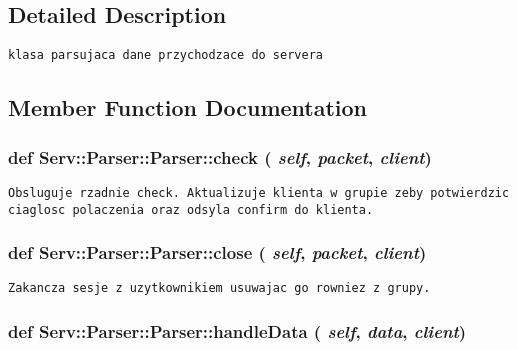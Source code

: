 \subsection{Detailed Description}


\footnotesize\begin{verbatim}klasa parsujaca dane przychodzace do servera

\end{verbatim}
\normalsize
 

\subsection{Member Function Documentation}
\hypertarget{class_serv_1_1_parser_1_1_parser_93e284233267c2db61d20d9239fed4c8}{
\subsubsection[{check}]{\setlength{\rightskip}{0pt plus 5cm}def Serv::Parser::Parser::check ( {\em self}, \/   {\em packet}, \/   {\em client})}}
\label{class_serv_1_1_parser_1_1_parser_93e284233267c2db61d20d9239fed4c8}




\footnotesize\begin{verbatim}Obsluguje rzadnie check. Aktualizuje klienta w grupie zeby potwierdzic ciaglosc polaczenia oraz odsyla confirm do klienta.

\end{verbatim}
\normalsize
 \hypertarget{class_serv_1_1_parser_1_1_parser_b6aa6195abf7a68df644640a8e4fd263}{
\subsubsection[{close}]{\setlength{\rightskip}{0pt plus 5cm}def Serv::Parser::Parser::close ( {\em self}, \/   {\em packet}, \/   {\em client})}}
\label{class_serv_1_1_parser_1_1_parser_b6aa6195abf7a68df644640a8e4fd263}




\footnotesize\begin{verbatim}Zakancza sesje z uzytkownikiem usuwajac go rowniez z grupy.

\end{verbatim}
\normalsize
 \hypertarget{class_serv_1_1_parser_1_1_parser_060ed5ba3cbf55b63ecc3f3aa006da04}{
\subsubsection[{handleData}]{\setlength{\rightskip}{0pt plus 5cm}def Serv::Parser::Parser::handleData ( {\em self}, \/   {\em data}, \/   {\em client})}}
\label{class_serv_1_1_parser_1_1_parser_060ed5ba3cbf55b63ecc3f3aa006da04}




